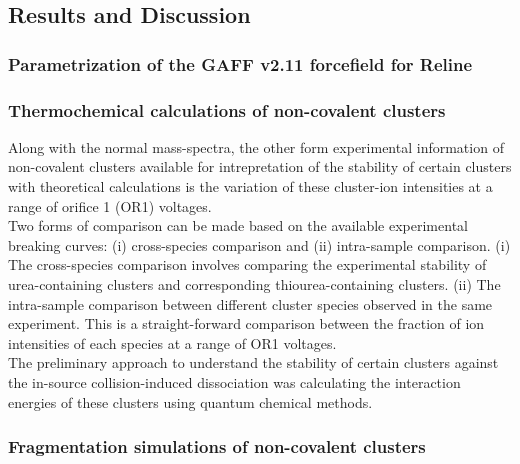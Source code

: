 \subsection*{Results and Discussion}
\subsubsection*{Parametrization of the GAFF v2.11 forcefield for Reline}
\subsubsection*{Thermochemical calculations of non-covalent clusters}
Along with the normal mass-spectra, the other form experimental information of non-covalent clusters available for intrepretation of the stability of certain clusters with theoretical calculations is the variation of these cluster-ion intensities at a range of orifice 1 (OR1) voltages.
 \\ Two forms of comparison can be made based on the available experimental breaking curves: (i) cross-species comparison and (ii) intra-sample comparison. (i) The cross-species comparison involves comparing the experimental stability of urea-containing clusters and corresponding thiourea-containing clusters. (ii) The intra-sample comparison between different cluster species observed in the same experiment. This is a straight-forward comparison between the fraction of ion intensities of each species at a range of OR1 voltages.
\\
 The preliminary approach to understand the stability of certain clusters against the in-source collision-induced dissociation was calculating the interaction energies of these clusters using quantum chemical methods. \\

\subsubsection*{Fragmentation simulations of non-covalent clusters}